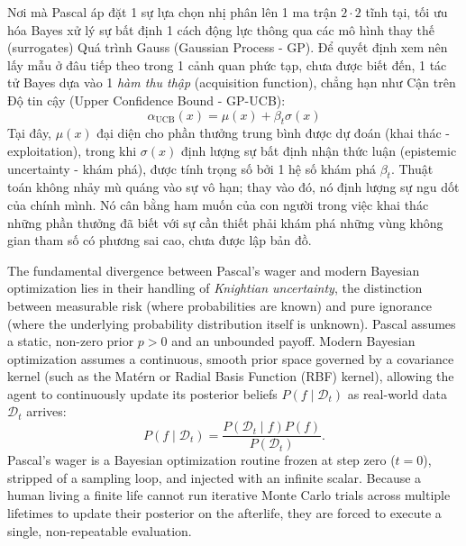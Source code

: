 \documentclass[11pt]{article}
\begin{document}
Nơi mà Pascal áp đặt 1 sự lựa chọn nhị phân lên 1 ma trận $2 \cdot 2$ tĩnh tại, tối ưu hóa Bayes xử lý sự bất định 1 cách động lực thông qua các mô hình thay thế (surrogates) Quá trình Gauss (Gaussian Process - GP). Để quyết định xem nên lấy mẫu ở đâu tiếp theo trong 1 cảnh quan phức tạp, chưa được biết đến, 1 tác tử Bayes dựa vào 1 \emph{hàm thu thập} (acquisition function), chẳng hạn như Cận trên Độ tin cậy (Upper Confidence Bound - GP-UCB):
\[ \alpha_{\text{UCB}}(x) = \mu(x) + \beta_t \sigma(x) \]
Tại đây, $\mu(x)$ đại diện cho phần thưởng trung bình được dự đoán (khai thác - exploitation), trong khi $\sigma(x)$ định lượng sự bất định nhận thức luận (epistemic uncertainty - khám phá), được tính trọng số bởi 1 hệ số khám phá $\beta_t$. Thuật toán không nhảy mù quáng vào sự vô hạn; thay vào đó, nó định lượng sự ngu dốt của chính mình. Nó cân bằng ham muốn của con người trong việc khai thác những phần thưởng đã biết với sự cần thiết phải khám phá những vùng không gian tham số có phương sai cao, chưa được lập bản đồ.

The fundamental divergence between Pascal's wager and modern Bayesian optimization lies in their handling of \emph{Knightian uncertainty}, the distinction between measurable risk (where probabilities are known) and pure ignorance (where the underlying probability distribution itself is unknown). Pascal assumes a static, non-zero prior $p > 0$ and an unbounded payoff. Modern Bayesian optimization assumes a continuous, smooth prior space governed by a covariance kernel (such as the Mat\'ern or Radial Basis Function (RBF) kernel), allowing the agent to continuously update its posterior beliefs $P(f \mid \mathcal{D}_t)$ as real-world data $\mathcal{D}_t$ arrives:
\begin{equation*}
	P(f \mid \mathcal{D}_t) = \frac{P(\mathcal{D}_t \mid f) P(f)}{P(\mathcal{D}_t)}.
\end{equation*}
Pascal's wager is a Bayesian optimization routine frozen at step zero ($t = 0$), stripped of a sampling loop, and injected with an infinite scalar. Because a human living a finite life cannot run iterative Monte Carlo trials across multiple lifetimes to update their posterior on the afterlife, they are forced to execute a single, non-repeatable evaluation.
\end{document}
